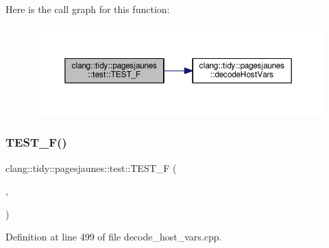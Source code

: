 Here is the call graph for this function\+:
\nopagebreak
\begin{figure}[H]
\begin{center}
\leavevmode
\includegraphics[width=350pt]{namespaceclang_1_1tidy_1_1pagesjaunes_1_1test_a33236157fda3ec5efa2bd2519a725255_cgraph}
\end{center}
\end{figure}
\mbox{\label{namespaceclang_1_1tidy_1_1pagesjaunes_1_1test_ab378b25f1d62bda9ba744b08b654e7c5}} 
\subsubsection{\texorpdfstring{T\+E\+S\+T\+\_\+\+F()}{TEST\_F()}\hspace{0.1cm}{\footnotesize\ttfamily [55/57]}}
{\footnotesize\ttfamily clang\+::tidy\+::pagesjaunes\+::test\+::\+T\+E\+S\+T\+\_\+F (\begin{DoxyParamCaption}\item[{\hyperlink{classclang_1_1tidy_1_1pagesjaunes_1_1test_1_1_decode_host_vars_test}{Decode\+Host\+Vars\+Test}}]{,  }\item[{Decode\+Host\+Vars\+Mixed\+With\+Indicators}]{ }\end{DoxyParamCaption})}



Definition at line 499 of file decode\+\_\+host\+\_\+vars.\+cpp.

